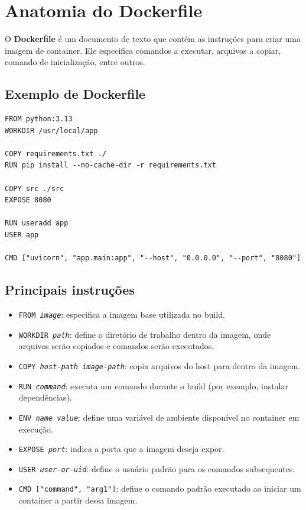 \section{Anatomia do Dockerfile}

O \textbf{Dockerfile} é um documento de texto que contém as instruções para criar uma imagem de container. Ele especifica comandos a executar, arquivos a copiar, comando de inicialização, entre outros.

\subsection{Exemplo de Dockerfile}

\begin{verbatim}
FROM python:3.13
WORKDIR /usr/local/app

COPY requirements.txt ./
RUN pip install --no-cache-dir -r requirements.txt

COPY src ./src
EXPOSE 8080

RUN useradd app
USER app

CMD ["uvicorn", "app.main:app", "--host", "0.0.0.0", "--port", "8080"]
\end{verbatim}

\subsection{Principais instruções}

\begin{itemize}
    \item \texttt{FROM \textit{image}}: especifica a imagem base utilizada no build.
    \item \texttt{WORKDIR \textit{path}}: define o diretório de trabalho dentro da imagem, onde arquivos serão copiados e comandos serão executados.
    \item \texttt{COPY \textit{host-path} \textit{image-path}}: copia arquivos do host para dentro da imagem.
    \item \texttt{RUN \textit{command}}: executa um comando durante o build (por exemplo, instalar dependências).
    \item \texttt{ENV \textit{name} \textit{value}}: define uma variável de ambiente disponível no container em execução.
    \item \texttt{EXPOSE \textit{port}}: indica a porta que a imagem deseja expor.
    \item \texttt{USER \textit{user-or-uid}}: define o usuário padrão para os comandos subsequentes.
    \item \texttt{CMD ["command", "arg1"]}: define o comando padrão executado ao iniciar um container a partir dessa imagem.
\end{itemize}

